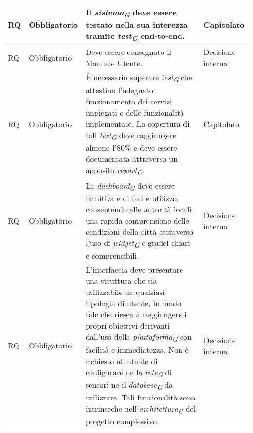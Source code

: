 \begin{longtable}{|C{1.5cm}|C{2cm}|L{5cm}|C{2cm}|}
    \hline
     RQ & Obbligatorio & Il \textit{sistema}\textsubscript{\textit{G}} deve essere testato nella sua interezza tramite \textit{test}\textsubscript{\textit{G}} end-to-end. & Capitolato \\

    \hline
     RQ & Obbligatorio & Deve essere consegnato il Manuale Utente. & Decisione interna \\

    \hline
     RQ & Obbligatorio & È necessario superare \textit{test}\textsubscript{\textit{G}} che attestino l'adeguato funzionamento dei servizi impiegati e delle funzionalità implementate. La copertura di tali \textit{test}\textsubscript{\textit{G}} deve raggiungere almeno l'80\% e deve essere documentata attraverso un apposito \textit{report}\textsubscript{\textit{G}}. & Capitolato \\

    \hline
     RQ & Obbligatorio & La \textit{dashboard}\textsubscript{\textit{G}} deve essere intuitiva e di facile utilizzo, consentendo alle autorità locali una rapida comprensione delle condizioni della città attraverso l'uso di \textit{widget}\textsubscript{\textit{G}} e grafici chiari e comprensibili. & Decisione interna \\

    \hline
     RQ & Obbligatorio & L’interfaccia deve presentare una struttura che sia utilizzabile da qualsiasi tipologia di utente, in modo tale che riesca a raggiungere i propri obiettivi derivanti dall’uso della \textit{piattaforma}\textsubscript{\textit{G}} con facilità e immediatezza. Non è richiesto all’utente di configurare ne la \textit{rete}\textsubscript{\textit{G}} di sensori ne il \textit{database}\textsubscript{\textit{G}} da utilizzare. Tali funzionalità sono intrinseche nell’\textit{architettura}\textsubscript{\textit{G}} del progetto complessivo. & Decisione interna \\

    \hline
   
\end{longtable}